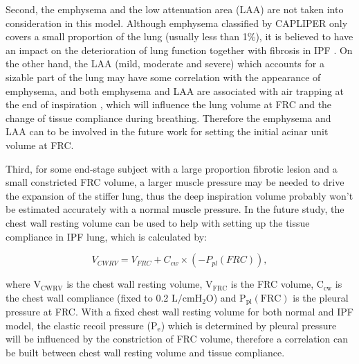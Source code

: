 Second, the emphysema and the low attenuation area (LAA) are not taken into consideration in this model. Although emphysema classified by CAPLIPER only covers a small proportion of the lung (usually less than 1\%), it is believed to have an impact on the deterioration of lung function together with fibrosis in IPF \citep{cottin2005combined, king2011idiopathic, lin2015combined}. On the other hand, the LAA (mild, moderate and severe) which accounts for a sizable part of the lung may have some correlation with the appearance of emphysema, and both emphysema and LAA are associated with air trapping at the end of inspiration \cite{slebos2015air, hoesein2017air}, which will influence the lung volume at FRC and the change of tissue compliance during breathing. Therefore the emphysema and LAA can to be involved in the future work for setting the initial acinar unit volume at FRC. 

Third, for some end-stage subject with a large proportion fibrotic lesion and a small constricted FRC volume, a larger muscle pressure may be needed to drive the expansion of the stiffer lung, thus the deep inspiration volume probably won't be estimated accurately with a normal muscle pressure. In the future study, the chest wall resting volume can be used to help with setting up the tissue compliance in IPF lung, which is calculated by:

\begin{equation} 
 \label{eq:ChestWallRestingVolume}
 V_{CWRV} = V_{FRC} + C_{cw} \times (-P_{pl}(FRC)),
\end{equation} 

\noindent where $\mathrm{V_{CWRV}}$ is the chest wall resting volume,  $\mathrm{V_{FRC}}$ is the FRC volume, $\mathrm{C_{cw}}$ is the chest wall compliance (fixed to 0.2 $\mathrm{L/cmH_2O}$) and $\mathrm{P_{pl}(FRC)}$ is the pleural pressure at FRC. With a fixed chest wall resting volume for both normal and IPF model, the elastic recoil pressure ($\mathrm{P_e}$) which is determined by pleural pressure will be influenced by the constriction of FRC volume, therefore a correlation can be built between chest wall resting volume and tissue compliance.

